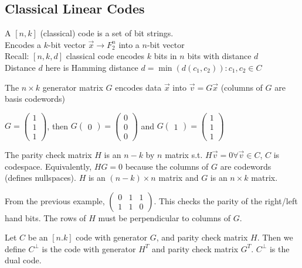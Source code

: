 \subsection{Classical Linear Codes}
A $[n,k]$ (classical) code is a set of bit strings. \\
Encodes a $k$-bit vector $\Vec{x} \rightarrow F_2^n$ into a $n$-bit vector \\
Recall: $[n,k,d]$ classical code encodes $k$ bits in $n$ bits with distance $d$ \\
Distance $d$ here is Hamming distance $d = \min(d(c_1,c_2)) : c_1, c_2 \in C $
\begin{definition}
    The $n \times k$ generator matrix $G$ encodes data $\vec{x}$ into $\vec{v} = G \vec{x}$ (columns of $G$ are basis codewords)
\end{definition}
\begin{example}
    $G = \begin{pmatrix} 1 \\ 1 \\ 1 \end{pmatrix}$, then $G \begin{pmatrix} 0 \end{pmatrix} = \begin{pmatrix} 0 \\ 0 \\ 0 \end{pmatrix}$ and $G \begin{pmatrix} 1 \end{pmatrix} = \begin{pmatrix} 1 \\ 1 \\ 1 \end{pmatrix}$
\end{example}
\begin{definition}
    The parity check matrix $H$ is an $n - k$ by $n$ matrix s.t. $H\vec{v} = 0 \forall \vec{v} \in C$, $C$ is codespace. Equivalently, $HG=0$ because the columns of $G$ are codewords (defines nullspaces). $H$ is an $(n-k) \times n$ matrix and $G$ is an $n\times k$ matrix. 
\end{definition}
\begin{example}
    From the previous example, $\begin{pmatrix} 0 & 1 & 1 \\ 1 & 1 & 0 \end{pmatrix}$. This checks the parity of the right/left hand bits. The rows of $H$ must be perpendicular to columns of $G$.    
\end{example}
\begin{definition}
    Let $C$ be an $[n.k]$ code with generator $G$, and parity check matrix $H$. Then we define $C^\perp$ is the code with generator $H^T$ and parity check matrix $G^T$. $C^\perp$ is the dual code. 
\end{definition}


